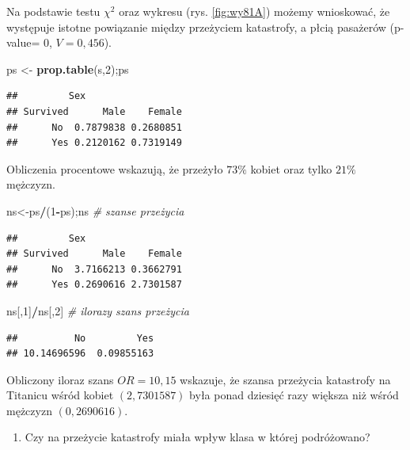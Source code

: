 \documentclass[polish,]{book}
\newenvironment{Shaded}{\begin{snugshade}}{\end{snugshade}}
\newcommand{\CommentTok}[1]{\textcolor[rgb]{0.56,0.35,0.01}{\textit{#1}}}
\newcommand{\DecValTok}[1]{\textcolor[rgb]{0.00,0.00,0.81}{#1}}
\newcommand{\KeywordTok}[1]{\textcolor[rgb]{0.13,0.29,0.53}{\textbf{#1}}}
\newcommand{\NormalTok}[1]{#1}
\newcommand{\OperatorTok}[1]{\textcolor[rgb]{0.81,0.36,0.00}{\textbf{#1}}}
\newcommand{\StringTok}[1]{\textcolor[rgb]{0.31,0.60,0.02}{#1}}
\providecommand{\tightlist}{%
  \setlength{\itemsep}{0pt}\setlength{\parskip}{0pt}}
\begin{document}
Na podstawie testu \(\chi^2\) oraz wykresu (rys. \ref{fig:wy81A}) możemy wnioskować, że występuje istotne powiązanie między przeżyciem katastrofy, a płcią pasażerów (p-value= 0, \(V = 0,456\)).

\begin{Shaded}
\begin{Highlighting}[]
\NormalTok{ps <-}\StringTok{ }\KeywordTok{prop.table}\NormalTok{(s,}\DecValTok{2}\NormalTok{);ps}
\end{Highlighting}
\end{Shaded}

\begin{verbatim}
##         Sex
## Survived      Male    Female
##      No  0.7879838 0.2680851
##      Yes 0.2120162 0.7319149
\end{verbatim}

Obliczenia procentowe wskazują, że przeżyło \(73\%\) kobiet oraz tylko \(21\%\) mężczyzn.

\begin{Shaded}
\begin{Highlighting}[]
\NormalTok{ns<-ps}\OperatorTok{/}\NormalTok{(}\DecValTok{1}\OperatorTok{-}\NormalTok{ps);ns }\CommentTok{# szanse przeżycia}
\end{Highlighting}
\end{Shaded}

\begin{verbatim}
##         Sex
## Survived      Male    Female
##      No  3.7166213 0.3662791
##      Yes 0.2690616 2.7301587
\end{verbatim}

\begin{Shaded}
\begin{Highlighting}[]
\NormalTok{ns[,}\DecValTok{1}\NormalTok{]}\OperatorTok{/}\NormalTok{ns[,}\DecValTok{2}\NormalTok{]    }\CommentTok{# ilorazy szans przeżycia}
\end{Highlighting}
\end{Shaded}

\begin{verbatim}
##          No         Yes 
## 10.14696596  0.09855163
\end{verbatim}

Obliczony iloraz szans \(OR = 10,15\) wskazuje, że szansa przeżycia katastrofy na Titanicu wśród kobiet \((2,7301587)\) była ponad dziesięć razy większa niż wśród mężczyzn \((0,2690616)\).

\begin{enumerate}
\def\labelenumi{\arabic{enumi}.}
\setcounter{enumi}{1}
\tightlist
\item
  Czy na przeżycie katastrofy miała wpływ klasa w której podróżowano?
\end{enumerate}
\end{document}
